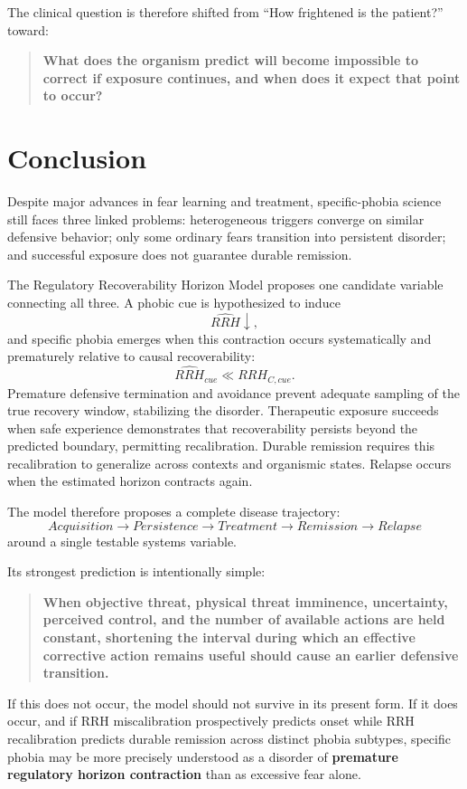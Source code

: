 \documentclass[11pt]{article}
\begin{document}
The clinical question is therefore shifted from ``How frightened is the patient?'' toward:

\begin{quote}
\textbf{What does the organism predict will become impossible to correct if exposure continues, and when does it expect that point to occur?}
\end{quote}

\section{Conclusion}

Despite major advances in fear learning and treatment, specific-phobia science still faces three linked problems: heterogeneous triggers converge on similar defensive behavior; only some ordinary fears transition into persistent disorder; and successful exposure does not guarantee durable remission.

The Regulatory Recoverability Horizon Model proposes one candidate variable connecting all three. A phobic cue is hypothesized to induce
\[
\widehat{RRH}\downarrow,
\]
and specific phobia emerges when this contraction occurs systematically and prematurely relative to causal recoverability:
\[
\widehat{RRH}_{cue}\ll RRH_{C,cue}.
\]
Premature defensive termination and avoidance prevent adequate sampling of the true recovery window, stabilizing the disorder. Therapeutic exposure succeeds when safe experience demonstrates that recoverability persists beyond the predicted boundary, permitting recalibration. Durable remission requires this recalibration to generalize across contexts and organismic states. Relapse occurs when the estimated horizon contracts again.

The model therefore proposes a complete disease trajectory:
\[
\boxed{Acquisition\rightarrow Persistence\rightarrow Treatment\rightarrow Remission\rightarrow Relapse}
\]
around a single testable systems variable.

Its strongest prediction is intentionally simple:

\begin{quote}
\textbf{When objective threat, physical threat imminence, uncertainty, perceived control, and the number of available actions are held constant, shortening the interval during which an effective corrective action remains useful should cause an earlier defensive transition.}
\end{quote}

If this does not occur, the model should not survive in its present form. If it does occur, and if RRH miscalibration prospectively predicts onset while RRH recalibration predicts durable remission across distinct phobia subtypes, specific phobia may be more precisely understood as a disorder of \textbf{premature regulatory horizon contraction} than as excessive fear alone.
\end{document}
